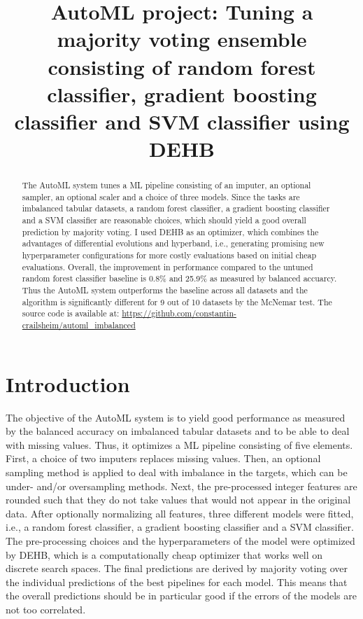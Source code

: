\documentclass[11pt]{article}
\title{AutoML project: Tuning a majority voting ensemble consisting of random forest classifier, gradient boosting classifier and SVM classifier using DEHB}
\author[1]{\nameemail{Constantin von Crailsheim}{C.Crailsheim@campus.lmu.de}}
\affil[1]{LMU Munich, Institute of Statistics}
\begin{document}
\maketitle

\begin{abstract}
The AutoML system tunes a ML pipeline consisting of an imputer, an optional sampler, an optional scaler and a choice of three models. Since the tasks are imbalanced tabular datasets, a random forest classifier, a gradient boosting classifier and a SVM classifier are reasonable choices, which should yield a good overall prediction by majority voting. I used DEHB as an optimizer, which combines the advantages of differential evolutions and hyperband, i.e., generating promising new hyperparameter configurations for more costly evaluations based on initial cheap evaluations. Overall, the improvement in performance compared to the untuned random forest classifier baseline is 0.8\% and 25.9\% as measured by balanced accuarcy. Thus the AutoML system outperforms the baseline across all datasets and the algorithm is significantly different for 9 out of 10 datasets by the McNemar test. The source code is available at: \url{https://github.com/constantin-crailsheim/automl_imbalanced}
\end{abstract}



\section{Introduction}

The objective of the AutoML system is to yield good performance as measured by the balanced accuracy on imbalanced tabular datasets and to be able to deal with missing values. Thus, it optimizes a ML pipeline consisting of five elements. First, a choice of two imputers replaces missing values. Then, an optional sampling method is applied to deal with imbalance in the targets, which can be under- and/or oversampling methods. Next, the pre-processed integer features are rounded such that they do not take values that would not appear in the original data. After optionally normalizing all features, three different models were fitted, i.e., a random forest classifier, a gradient boosting classifier and a SVM classifier. The pre-processing choices and the hyperparameters of the model were optimized by DEHB, which is a computationally cheap optimizer that works well on discrete search spaces. The final predictions are derived by majority voting over the individual predictions of the best pipelines for each model. This means that the overall predictions should be in particular good if the errors of the models are not too correlated.
\end{document}
